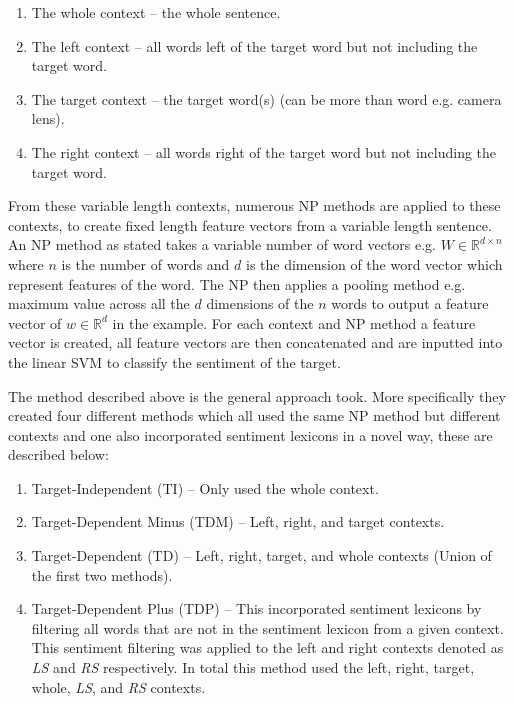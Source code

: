 \begin{enumerate}
    \item The whole context -- the whole sentence.
    \item The left context -- all words left of the target word but not including the target word.
    \item The target context -- the target word(s) (can be more than word e.g. camera lens).
    \item The right context -- all words right of the target word but not including the target word.
\end{enumerate}

From these variable length contexts, numerous NP methods are applied to these contexts, to create fixed length feature vectors from a variable length sentence. An NP method as stated takes a variable number of word vectors e.g. $W \in \mathbb{R}^{d\times n}$ where $n$ is the number of words and $d$ is the dimension of the word vector which represent features of the word. The NP then applies a pooling method e.g. maximum value across all the $d$ dimensions of the $n$ words to output a feature vector of $w \in \mathbb{R}^{d}$ in the example. For each context and NP method a feature vector is created, all feature vectors are then concatenated and are inputted into the linear SVM to classify the sentiment of the target.

The method described above is the general approach \citet{vo2015target} took. More specifically they created four different methods which all used the same NP method but different contexts and one also incorporated sentiment lexicons in a novel way, these are described below:

\begin{enumerate}
    \item Target-Independent (TI) -- Only used the whole context.
    \item Target-Dependent Minus (TDM) -- Left, right, and target contexts.
    \item Target-Dependent (TD) -- Left, right, target, and whole contexts (Union of the first two methods).
    \item Target-Dependent Plus (TDP) -- This incorporated sentiment lexicons by filtering all words that are not in the sentiment lexicon from a given context. This sentiment filtering was applied to the left and right contexts denoted as \textit{LS} and \textit{RS} respectively. In total this method used the left, right, target, whole, \textit{LS}, and \textit{RS} contexts.
\end{enumerate}

